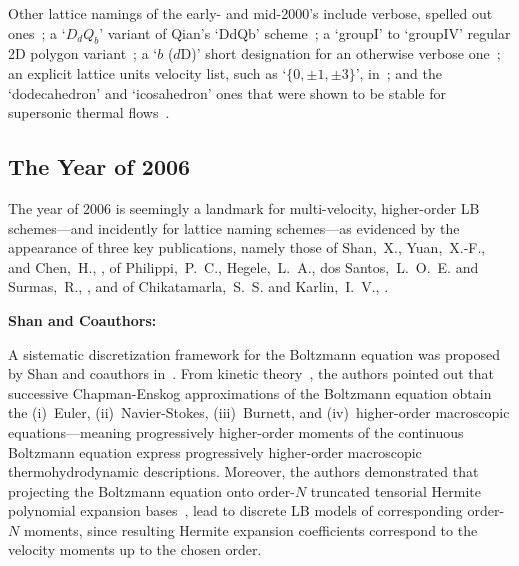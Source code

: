     Other     lattice     namings     of     the     early-     and     mid-2000's     include     verbose,     spelled      out
    ones~\cite{2001-dHumieresD+LallemandP-PhysRevE,   2005-LuXY-IntJModPhysC};   a   `$D_dQ_b$'   variant   of   Qian's   `DdQb'
    scheme~\cite{2003-NourgalievRR+JosephD-IntJMulFlow};     a     `groupI'     to     `groupIV'     regular     2D      polygon
    variant~\cite{2003-WatariM+TsutaharaM-PhysRevE, 2007-WatariM-PhysA}; a `$b$  ($d$D)'  short  designation  for  an  otherwise
    verbose one~\cite{2006-ChikatamarlaSS+KarlinIV-PhysRevLett}; an explicit lattice units velocity list, such as `$\{0, \pm  1,
    \pm 3\}$', in~\cite{2006-ChikatamarlaSS+KarlinIV-PhysRevLett}; and the `dodecahedron' and `icosahedron' ones that were shown
    to be stable for supersonic thermal flows~\cite{2006-WatariM+TsutaharaM-PhysA, 2007-WatariM-PhysA}.

    \subsection{The Year of 2006}

    The year of 2006 is seemingly a landmark for multi-velocity, higher-order LB schemes---and  incidently  for  lattice  naming
    schemes---as evidenced by the appearance of three key publications, namely those of  Shan,~X.,  Yuan,~X.-F.,  and  Chen,~H.,
    \cite{2006-ShanX+ChenH-JFluidMech},   of   Philippi,~P.~C.,   Hegele,~L.~A.,   dos    Santos,~L.~O.~E.    and    Surmas,~R.,
    \cite{2006-PhilippiPC+SurmasR-PhysRevE},        and        of         Chikatamarla,~S.~S.         and         Karlin,~I.~V.,
    \cite{2006-ChikatamarlaSS+KarlinIV-PhysRevLett}.

    \vspace{2.0mm}\noindent\textbf{Shan and Coauthors:}\vspace{1.0mm}

    A  sistematic   discretization   framework   for   the   Boltzmann   equation   was   proposed   by   Shan   and   coauthors
    in~\cite{2006-ShanX+ChenH-JFluidMech}.  From  kinetic  theory~\cite{2011-HarrisS-Dover,   2003-LiboffRL-bookSpringer},   the
    authors pointed out  that  successive  Chapman-Enskog  approximations  of  the  Boltzmann  equation  obtain  the  (i)~Euler,
    (ii)~Navier-Stokes, (iii)~Burnett, and (iv)~high\-er-or\-der macroscopic equations---meaning progressively  high\-er-or\-der
    moments  of  the  continuous  Boltzmann  equation  express  progressively  high\-er-or\-der  macroscopic  thermohydrodynamic
    descriptions. Moreover, the authors demonstrated that projecting the Boltzmann equation onto order-$N$  truncated  tensorial
    Hermite polynomial expansion bases~\cite{1949-GradH-CommPureApplMath}, lead  to  discrete  LB  models  of  corres\-pon\-ding
    order-$N$ moments, since resulting Hermite expansion coefficients correspond to the velocity moments up to the chosen order.

